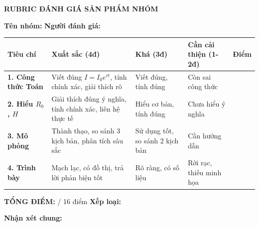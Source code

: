 \documentclass[12pt,a4paper]{article}
\begin{document}
\vspace{0.8cm}

\begin{center}
{\Large\bfseries\sffamily\color{primary} RUBRIC ĐÁNH GIÁ SẢN PHẨM NHÓM}
\end{center}

\vspace{0.3cm}
\noindent\textbf{Tên nhóm:} \underline{\hspace{4cm}} \hfill \textbf{Người đánh giá:} \underline{\hspace{4cm}}

\vspace{0.5cm}
\begin{tabularx}{\textwidth}{|>{\raggedright\arraybackslash}p{2.2cm}|X|X|X|c|}
\hline
\rowcolor{TableHeader}
\sffamily\bfseries Tiêu chí & \sffamily\bfseries Xuất sắc (4đ) & \sffamily\bfseries Khá (3đ) & \sffamily\bfseries Cần cải thiện (1-2đ) & \sffamily\bfseries Điểm \\
\hline
\textbf{1. Công thức Toán} & Viết đúng $I=I_0 e^{rt}$, tính chính xác, giải thích rõ & Viết đúng, tính đúng & Còn sai công thức & \underline{\hspace{0.8cm}} \\
\hline
\textbf{2. Hiểu $R_0$, $H$} & Giải thích đúng ý nghĩa, tính chính xác, liên hệ thực tế & Hiểu cơ bản, tính đúng & Chưa hiểu ý nghĩa & \underline{\hspace{0.8cm}} \\
\hline
\textbf{3. Mô phỏng} & Thành thạo, so sánh 3 kịch bản, phân tích sâu sắc & Sử dụng tốt, so sánh 2 kịch bản & Cần hướng dẫn & \underline{\hspace{0.8cm}} \\
\hline
\textbf{4. Trình bày} & Mạch lạc, có đồ thị, trả lời phản biện tốt & Rõ ràng, có số liệu & Rời rạc, thiếu minh họa & \underline{\hspace{0.8cm}} \\
\hline
\end{tabularx}

\vspace{0.3cm}
\noindent\textbf{TỔNG ĐIỂM:} \underline{\hspace{1.5cm}} / 16 điểm \hfill \textbf{Xếp loại:} \underline{\hspace{3cm}}

\vspace{0.3cm}
\noindent\textbf{Nhận xét chung:}
\end{document}

